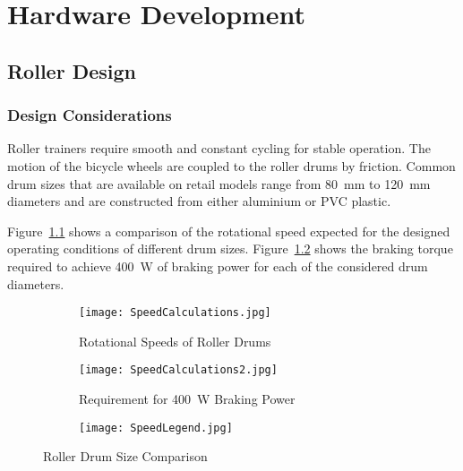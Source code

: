 
\chapter{Hardware Development}
\label{ch:hardware}
\section{Roller Design}
\label{sec:opspeed}

\subsection{Design Considerations}

Roller trainers require smooth and constant cycling for stable operation. The motion of the bicycle wheels are coupled to the roller drums by friction. Common drum sizes that are available on retail models range from \SI{80}{\milli\meter} to \SI{120}{\milli\meter} diameters and are constructed from either aluminium or PVC plastic. 


Figure~\ref{fig:Speed2} shows a comparison of the rotational speed expected for the designed operating conditions of different drum sizes. Figure~\ref{fig:Speed} shows the braking torque required to achieve \SI{400}{\watt} of braking power for each of the considered drum diameters.

\begin{figure}[H]
	\centering
	\begin{subfigure}[b]{.475\textwidth}
		\centering
		\texttt{[image: SpeedCalculations.jpg]}
		\caption{Rotational Speeds of Roller Drums}
		\label{fig:Speed2}
	\end{subfigure}
	\hfill
	\begin{subfigure}[b]{.475\textwidth}
		\centering
		\texttt{[image: SpeedCalculations2.jpg]}
		\caption{Requirement for \SI{400}{\watt} Braking Power}
		\label{fig:Speed}
	\end{subfigure}
	\begin{subfigure}{.475\textwidth}
		\centering
		\texttt{[image: SpeedLegend.jpg]}
	\end{subfigure}
	\caption{Roller Drum Size Comparison}
	\label{fig:a}
\end{figure}

